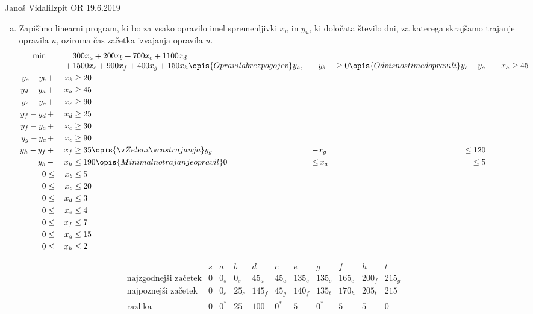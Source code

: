 \begin{naloga}{Janoš Vidali}{Izpit OR 19.6.2019}
\begin{odgovor}
\begin{enumerate}[(a)]
\item Zapišimo linearni program,
ki bo za vsako opravilo imel spremenljivki $x_u$ in $y_u$,
ki določata število dni, za katerega skrajšamo trajanje opravila $u$,
oziroma čas začetka izvajanja opravila $u$.
\begin{alignat*}{2}
\min &&&{} 300 x_a + 200 x_b + 700 x_c + 1100 x_d \\[-1mm]
&&+\,&{} 1500 x_e + 900 x_f + 400 x_g + 150 x_h
\opis{Opravila brez pogojev}
y_a, &&{} y_b &\ge 0
\opis{Odvisnosti med opravili}
y_c - y_a &\,+& x_a &\ge 45 \\
y_c - y_b &\,+& x_b &\ge 20 \\
y_d - y_a &\,+& x_a &\ge 45 \\
y_e - y_c &\,+& x_c &\ge 90 \\
y_f - y_d &\,+& x_d &\ge 25 \\
y_f - y_e &\,+& x_e &\ge 30 \\
y_g - y_c &\,+& x_c &\ge 90 \\
y_h - y_f &\,+& x_f &\ge 35
\opis{Želeni čas trajanja}
y_g &\,-& x_g &\le 120 \\
y_h &\,-& x_h &\le 190
\opis{Minimalno trajanje opravil}
0 &\le&\, x_a &\le 5 \\
0 &\le&\, x_b &\le 5 \\
0 &\le&\, x_c &\le 20 \\
0 &\le&\, x_d &\le 3 \\
0 &\le&\, x_e &\le 4 \\
0 &\le&\, x_f &\le 7 \\
0 &\le&\, x_g &\le 15 \\
0 &\le&\, x_h &\le 2
\end{alignat*}
\end{enumerate}
%
\begin{slika}
\pgfslika
{}
\end{slika}
%
\begin{tabela}
$$
\begin{array}{c|cccccccccc}
& s & a & b & d & c & e & g & f & h & t \\ \hline
\text{najzgodnejši začetek} &
0 & 0_s & 0_s & 45_a & 45_a & 135_c & 135_c & 165_e & 200_f & 215_g \\
\text{najpoznejši začetek} &
0 & 0_c & 25_c & 145_f & 45_g & 140_f & 135_t & 170_h & 205_t & 215 \\
\text{razlika} &
0 & 0^* & 25 & 100 & 0^* & 5 & 0^* & 5 & 5 & 0
\end{array}
$$
\end{tabela}\end{odgovor}
\end{naloga}
